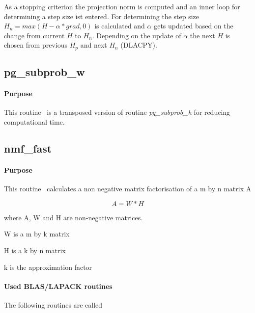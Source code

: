 \documentclass[a4paper,10pt]{scrartcl}
\begin{document}
					As a stopping criterion the projection norm is computed and an inner loop
					for determining a step size ist entered.\newline
					For determining the step size $H_n = max(H - \alpha * grad, 0)$ is
					calculated and $\alpha$ gets updated based on the change from current $H$ 
					to $H_n$. Depending on the update of $\alpha$ the next $H$ is chosen from
					previous $H_p$ and next $H_n$ (DLACPY).\newline

		\subsection{pg\_subprob\_w}

			\paragraph{Purpose}
				
					This routine~\cite{lin2007} is a transposed version of routine \emph{pg\_subprob\_h} for reducing
					computational time.\newline


		\subsection{nmf\_fast}

			\paragraph{Purpose}

					This routine~\cite{schmidt2008} calculates a non negative matrix factorisation of a m by n 
					matrix A\newline
					
					\begin{equation*}
						A = W * H
					\end{equation*}

 					where A, W and H are non-negative matrices.

 					W is a m by k matrix

 					H is a k by n matrix

 					k is the approximation factor

			\paragraph{Used BLAS/LAPACK routines}

					The following routines are called\newline
\end{document}
